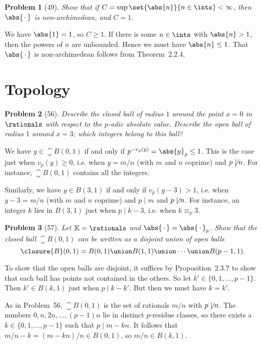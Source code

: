 \documentclass[a4paper, 11pt]{memoir}
\theoremstyle{plaincustomnumber}
\newtheorem{problem}{Problem}
\theoremstyle{changedotbreakcustomnumber}
\newcommand{\fieldK}{\mathbb{K}}
\begin{document}
\begin{problem}[49]
    Show that if $C = \sup \set{\abs{n}}{n \in \ints} < \infty$, then $\abs{\,\cdot\,}$ is non-archimedean, and $C = 1$.
\end{problem}

\begin{solution}
    We have $\abs{1} = 1$, so $C \geq 1$. If there is some $n \in \ints$ with $\abs{n} > 1$, then the powers of $n$ are unbounded. Hence we must have $\abs{n} \leq 1$. That $\abs{\,\cdot\,}$ is non-archimedean follows from Theorem~2.2.4.
\end{solution}


\addtocounter{section}{1}
\section{Topology}

\begin{problem}[56]
    Describe the closed ball of radius $1$ around the point $x = 0$ in $\rationals$ with respect to the $p$-adic absolute value. Describe the open ball of radius $1$ around $x = 3$; which integers belong to this ball?
\end{problem}

\begin{solution}
    We have $y \in \closure{B}(0,1)$ if and only if $p^{-v_p(y)} = \abs{y}_p \leq 1$. This is the case just when $v_p(y) \geq 0$, i.e. when $y = m/n$ (with $m$ and $n$ coprime) and $p \not\mid n$. For instance, $\closure{B}(0,1)$ contains all the integers.

    Similarly, we have $y \in B(3,1)$ if and only if $v_p(y-3) > 1$, i.e. when $y-3 = m/n$ (with $m$ and $n$ coprime) and $p \mid m$ and $p \not\mid n$. For instance, an integer $k$ lies in $B(3,1)$ just when $p \mid k-3$, i.e. when $k \equiv_p 3$.
\end{solution}


\begin{problem}[57]
    Let $\fieldK = \rationals$ and $\abs{\,\cdot\,} = \abs{\,\cdot\,}_p$. Show that the closed ball $\closure{B}(0,1)$ can be written as a disjoint union of open balls
    \begin{equation*}
        \closure{B}(0,1)
            = B(0,1) \union B(1,1) \union \cdots \union B(p-1,1).
    \end{equation*}
\end{problem}

\begin{solution}
    To show that the open balls are disjoint, it suffices by Proposition~2.3.7 to show that each ball has points not contained in the others. So let $k' \in \{0, 1, \ldots, p-1\}$. Then $k' \in B(k,1)$ just when $p \mid k-k'$. But then we must have $k = k'$.

    As in Problem~56, $\closure{B}(0,1)$ is the set of rationals $m/n$ with $p \not\mid n$. The numbers $0, n, 2n, \ldots, (p-1)n$ lie in distinct $p$-residue classes, so there exists a $k \in \{0, 1, \ldots, p-1\}$ such that $p \mid m - kn$. It follows that $m/n - k = (m-kn)/n \in B(0,1)$, so $m/n \in B(k,1)$.
\end{solution}
\end{document}
